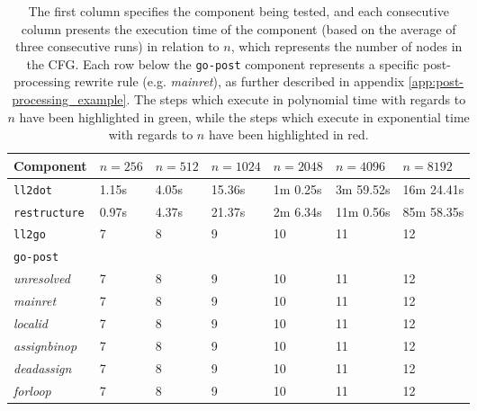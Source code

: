 \begin{table}[htbp]
	\begin{center}
		\begin{tabular}{|l|l|l|l|l|l|l|}
			\hline
			Component & $ n = 256 $ & $ n = 512 $ & $ n = 1024 $ & $ n = 2048 $ & $ n = 4096 $ & $ n = 8192 $ \\
			\hline
			\rowcolor{light_green_3}
			\texttt{ll2dot} & 1.15s & 4.05s & 15.36s & 1m 0.25s & 3m 59.52s & 16m 24.41s \\
			\rowcolor{light_green_3}
			\texttt{restructure} & 0.97s & 4.37s & 21.37s & 2m 6.34s & 11m 0.56s & 85m 58.35s \\
			\rowcolor{light_green_3}
			\texttt{ll2go} & 7 & 8 & 9 & 10 & 11 & 12 \\
			\hline
			\multicolumn{7}{|l|}{\texttt{go-post}} \\
			\hline
			\rowcolor{light_green_3}
			\textit{unresolved} & 7 & 8 & 9 & 10 & 11 & 12 \\
			\rowcolor{light_green_3}
			\textit{mainret} & 7 & 8 & 9 & 10 & 11 & 12 \\
			\rowcolor{light_red_3}
			\textit{localid} & 7 & 8 & 9 & 10 & 11 & 12 \\
			\rowcolor{light_green_3}
			\textit{assignbinop} & 7 & 8 & 9 & 10 & 11 & 12 \\
			\rowcolor{light_green_3}
			\textit{deadassign} & 7 & 8 & 9 & 10 & 11 & 12 \\
			\rowcolor{light_green_3}
			\textit{forloop} & 7 & 8 & 9 & 10 & 11 & 12 \\
			\hline
		\end{tabular}
	\end{center}
	\caption{The first column specifies the component being tested, and each consecutive column presents the execution time of the component (based on the average of three consecutive runs) in relation to $ n $, which represents the number of nodes in the CFG. Each row below the \texttt{go-post} component represents a specific post-processing rewrite rule (e.g. \textit{mainret}), as further described in appendix \ref{app:post-processing_example}. The steps which execute in polynomial time with regards to $ n $ have been highlighted in green, while the steps which execute in exponential time with regards to $ n $ have been highlighted in red.}
\end{table}

